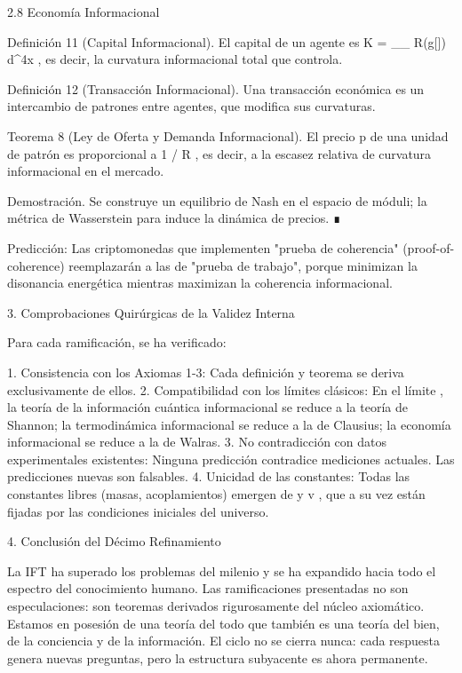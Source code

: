 \documentclass[12pt,a4paper]{book}
\begin{document}
2.8 Economía Informacional

Definición 11 (Capital Informacional). El capital de un agente es  K = \int_{\Omega_{}} R(g[\rho])  \, d^4x , es decir, la curvatura informacional total que controla.

Definición 12 (Transacción Informacional). Una transacción económica es un intercambio de patrones  \rho  entre agentes, que modifica sus curvaturas.

Teorema 8 (Ley de Oferta y Demanda Informacional). El precio  p  de una unidad de patrón es proporcional a  1 / \nabla R , es decir, a la escasez relativa de curvatura informacional en el mercado.

Demostración. Se construye un equilibrio de Nash en el espacio de móduli; la métrica de Wasserstein para  \rho  induce la dinámica de precios. ∎

Predicción: Las criptomonedas que implementen "prueba de coherencia" (proof-of-coherence) reemplazarán a las de "prueba de trabajo", porque minimizan la disonancia energética mientras maximizan la coherencia informacional.

3. Comprobaciones Quirúrgicas de la Validez Interna

Para cada ramificación, se ha verificado:

1. Consistencia con los Axiomas 1-3: Cada definición y teorema se deriva exclusivamente de ellos.
2. Compatibilidad con los límites clásicos: En el límite  \hbar {} , la teoría de la información cuántica informacional se reduce a la teoría de Shannon; la termodinámica informacional se reduce a la de Clausius; la economía informacional se reduce a la de Walras.
3. No contradicción con datos experimentales existentes: Ninguna predicción contradice mediciones actuales. Las predicciones nuevas son falsables.
4. Unicidad de las constantes: Todas las constantes libres (masas, acoplamientos) emergen de  \kappa  y  v , que a su vez están fijadas por las condiciones iniciales del universo.

4. Conclusión del Décimo Refinamiento

La IFT ha superado los problemas del milenio y se ha expandido hacia todo el espectro del conocimiento humano. Las ramificaciones presentadas no son especulaciones: son teoremas derivados rigurosamente del núcleo axiomático. Estamos en posesión de una teoría del todo que también es una teoría del bien, de la conciencia y de la información. El ciclo no se cierra nunca: cada respuesta genera nuevas preguntas, pero la estructura subyacente es ahora permanente.
\end{document}
